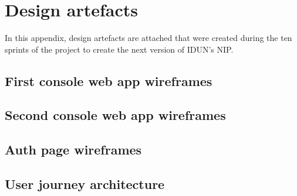 \chapter{Design artefacts}
\label{appendix5-design-artefacts}

In this appendix, design artefacts are attached that were created during the ten sprints of the project to create the next version of IDUN's NIP.

\section*{First console web app wireframes}

\section*{Second console web app wireframes}

\section*{Auth page wireframes}

\section*{User journey architecture}
